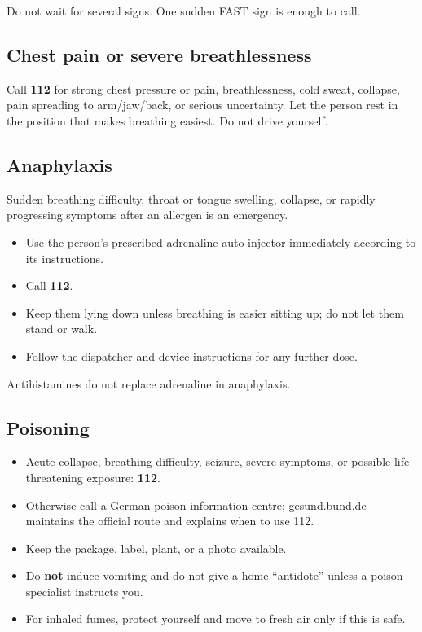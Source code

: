 Do not wait for several signs. One sudden FAST sign is enough to call.

\hypertarget{chest-pain-or-severe-breathlessness}{%
\subsection{Chest pain or severe
breathlessness}\label{chest-pain-or-severe-breathlessness}}

Call \textbf{112} for strong chest pressure or pain, breathlessness,
cold sweat, collapse, pain spreading to arm/jaw/back, or serious
uncertainty. Let the person rest in the position that makes breathing
easiest. Do not drive yourself.

\hypertarget{anaphylaxis}{%
\subsection{Anaphylaxis}\label{anaphylaxis}}

Sudden breathing difficulty, throat or tongue swelling, collapse, or
rapidly progressing symptoms after an allergen is an emergency.

\begin{itemize}
\tightlist
\item
  Use the person's prescribed adrenaline auto-injector immediately
  according to its instructions.
\item
  Call \textbf{112}.
\item
  Keep them lying down unless breathing is easier sitting up; do not let
  them stand or walk.
\item
  Follow the dispatcher and device instructions for any further dose.
\end{itemize}

Antihistamines do not replace adrenaline in anaphylaxis.

\hypertarget{poisoning}{%
\subsection{Poisoning}\label{poisoning}}

\begin{itemize}
\tightlist
\item
  Acute collapse, breathing difficulty, seizure, severe symptoms, or
  possible life-threatening exposure: \textbf{112}.
\item
  Otherwise call a German poison information centre; gesund.bund.de
  maintains the official route and explains when to use 112.
\item
  Keep the package, label, plant, or a photo available.
\item
  Do \textbf{not} induce vomiting and do not give a home ``antidote''
  unless a poison specialist instructs you.
\item
  For inhaled fumes, protect yourself and move to fresh air only if this
  is safe.
\end{itemize}

